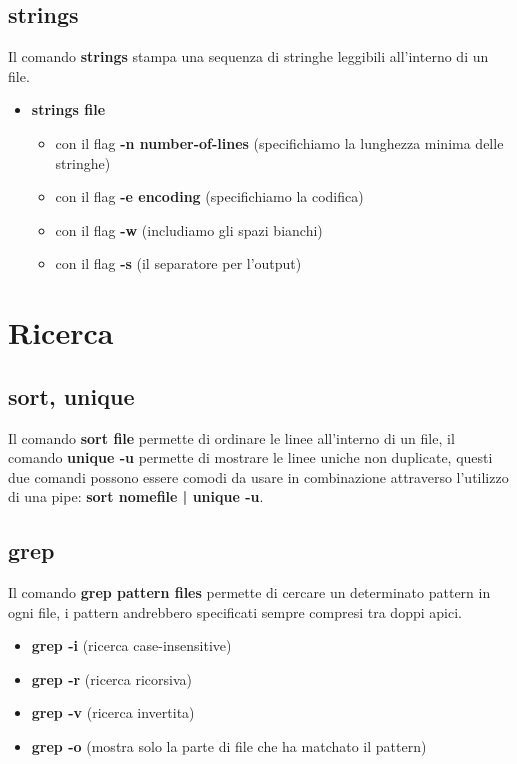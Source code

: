 \documentclass[oneside,a4paper,11pt]{book}
\theoremstyle{italicstyle}
\theoremstyle{normStyle}
\begin{document}
\subsection{strings}
Il comando \textbf{strings} stampa una sequenza di stringhe leggibili all'interno di un file.
\begin{itemize}
    \item \textbf{strings file}
    \begin{itemize}
        \item con il flag \textbf{-n number-of-lines} (specifichiamo la lunghezza minima delle stringhe)
        \item con il flag \textbf{-e encoding} (specifichiamo la codifica)
        \item con il flag \textbf{-w} (includiamo gli spazi bianchi)
        \item con il flag \textbf{-s} (il separatore per l'output)
    \end{itemize}
\end{itemize}

\section{Ricerca}
\subsection{sort, unique}
Il comando \textbf{sort file} permette di ordinare le linee all'interno di un file, il comando \textbf{unique -u} permette di mostrare le linee uniche non duplicate, questi due comandi possono essere comodi da usare in combinazione attraverso l'utilizzo di una pipe: \textbf{sort nomefile | unique -u}.

\subsection{grep}
Il comando \textbf{grep pattern files} permette di cercare un determinato pattern in ogni file, i pattern andrebbero specificati sempre compresi tra doppi apici.

\begin{itemize}
    \item \textbf{grep -i } (ricerca case-insensitive)
    \item \textbf{grep -r } (ricerca ricorsiva)
    \item \textbf{grep -v } (ricerca invertita)
    \item \textbf{grep -o } (mostra solo la parte di file che ha matchato il pattern)
\end{itemize}
\end{document}
